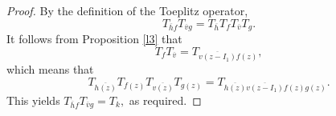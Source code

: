 \documentclass[11pt,reqno]{amsart}
\theoremstyle{definition}
\newtheorem{remark}[theorem]{Remark}
\begin{document}
\begin{proof}
By the definition of the Toeplitz operator, 
$$T_{\overline{h}f}T_{\overline{v}g}=T_{\overline{h}}T_{f}T_{\overline{v}}T_{g}.$$
It follows from Proposition \ref{l3} that 
$$T_{f}T_{\overline{v}}=T_{\overline{v(z-I_1)}f(z)},$$
which means that 
$$T_{\overline{h(z)}}T_{f(z)}T_{\overline{v(z)}}T_{g(z)}
=T_{\overline{h(z)}\overline{v(z-I_1)}f(z)g(z)}.$$  
This yields $T_{\overline{h}f}T_{\overline{v}g}=T_k,$ as required.
\end{proof}
\end{document}
